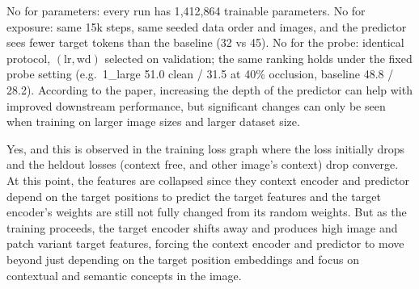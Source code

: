 \begin{description}[leftmargin=0pt,itemsep=2pt]
\item[Could extra parameters, different training exposure, or a probe change explain the result?] No for parameters: every
run has 1{,}412{,}864 trainable parameters. No for exposure: same 15k steps, same seeded data order and images, and the
predictor sees fewer target tokens than the baseline (32 vs 45). No for the probe: identical protocol, $(\mathrm{lr},\mathrm{wd})$
selected on validation; the same ranking holds under the fixed probe setting (e.g.\ 1\_large 51.0 clean / 31.5 at 40\%
occlusion, baseline 48.8 / 28.2). According to the paper, increasing the depth of the predictor can help with improved 
downstream performance, but significant changes can only be seen when training on larger image sizes and larger dataset size.

\item[Could apparent feature stability come from collapsed or uninformative representations?] Yes, and this is observed in 
the training loss graph where the loss initially drops and the heldout losses (context free, and other image's context) drop
converge. At this point, the features are collapsed since they context encoder and predictor depend on the target positions
to predict the target features and the target encoder's weights are still not fully changed from its random weights. But as
the training proceeds, the target encoder shifts away and produces high image and patch variant target features, forcing the 
context encoder and predictor to move beyond just depending on the target position embeddings and focus on contextual and 
semantic concepts in the image. 



\end{description}
